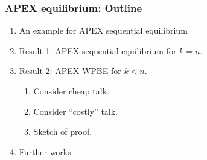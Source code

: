 \documentclass[8pt]{beamer}
\begin{document}
\begin{frame}


  \frametitle{APEX equilibrium: Outline}

\begin{enumerate}


\item An example for APEX sequential equilibrium
\item Result 1: APEX sequential equilibrium for $k=n$.
\item Result 2: APEX WPBE for $k<n$.
\begin{enumerate}
\item Consider cheap talk.
\item Consider ``costly'' talk.
\item Sketch of proof.
\end{enumerate}
\item Further works
\end{enumerate}


\end{frame}
\end{document}
